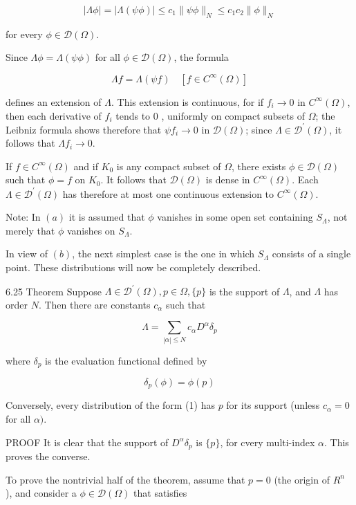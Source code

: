 \documentclass[10pt]{article}
\begin{document}
$$
|\Lambda \phi|=|\Lambda(\psi \phi)| \leq c_{1}\|\psi \phi\|_{N} \leq c_{1} c_{2}\|\phi\|_{N}
$$

for every $\phi \in \mathscr{D}(\Omega)$.

Since $\Lambda \phi=\Lambda(\psi \phi)$ for all $\phi \in \mathscr{D}(\Omega)$, the formula

$$
\Lambda f=\Lambda(\psi f) \quad\left[f \in C^{\infty}(\Omega)\right]
$$

defines an extension of $\Lambda$. This extension is continuous, for if $f_{i} \rightarrow 0$ in $C^{\infty}(\Omega)$, then each derivative of $f_{i}$ tends to 0 , uniformly on compact subsets of $\Omega$; the Leibniz formula shows therefore that $\psi f_{i} \rightarrow 0$ in $\mathscr{D}(\Omega)$; since $\Lambda \in \mathscr{D}^{\prime}(\Omega)$, it follows that $\Lambda f_{i} \rightarrow 0$.

If $f \in C^{\infty}(\Omega)$ and if $K_{0}$ is any compact subset of $\Omega$, there exists $\phi \in \mathscr{D}(\Omega)$ such that $\phi=f$ on $K_{0}$. It follows that $\mathscr{D}(\Omega)$ is dense in $C^{\infty}(\Omega)$. Each $\Lambda \in \mathscr{D}^{\prime}(\Omega)$ has therefore at most one continuous extension to $C^{\infty}(\Omega)$.

Note: In $(a)$ it is assumed that $\phi$ vanishes in some open set containing $S_{\Lambda}$, not merely that $\phi$ vanishes on $S_{\Lambda}$.

In view of $(b)$, the next simplest case is the one in which $S_{\Lambda}$ consists of a single point. These distributions will now be completely described.

6.25 Theorem Suppose $\Lambda \in \mathscr{D}^{\prime}(\Omega), p \in \Omega,\{p\}$ is the support of $\Lambda$, and $\Lambda$ has order $N$. Then there are constants $c_{\alpha}$ such that

$$
\Lambda=\sum_{|\alpha| \leq N} c_{\alpha} D^{\alpha} \delta_{p}
$$

where $\delta_{p}$ is the evaluation functional defined by

$$
\delta_{p}(\phi)=\phi(p)
$$

Conversely, every distribution of the form (1) has $p$ for its support (unless $c_{\alpha}=0$ for all $\alpha)$.

PROOF It is clear that the support of $D^{\alpha} \delta_{p}$ is $\{p\}$, for cvery multi-index $\alpha$. This proves the converse.

To prove the nontrivial half of the theorem, assume that $p=0$ (the origin of $R^{n}$ ), and consider a $\phi \in \mathscr{D}(\Omega)$ that satisfies
\end{document}

